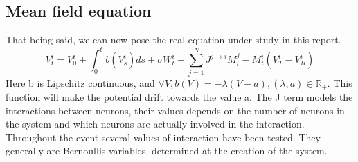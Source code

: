 	\subsection{Mean field equation}
	That being said, we can now pose the real equation under study in this report.\\
	\[
		V_t^i=V_0^i+\int_0^tb(V_s^i)ds+\sigma W_t^i+\sum_{j=1}^NJ^{j\rightarrow i}M_t^j-M_t^i(V_T^i-V_R^i)
	\]
	Here b is Lipschitz continuous, and $\forall V, b(V)=-\lambda(V-a), (\lambda,a)\in\mathbb{R}_+$. This function will make the potential drift towards the value a. The J term models the interactions between neurons, their values depends on the number of neurons in the system and which neurons are actually involved in the interaction. \\
	Throughout the event several values of interaction have been tested. They generally are Bernoullis variables, determined at the creation of the system.\\